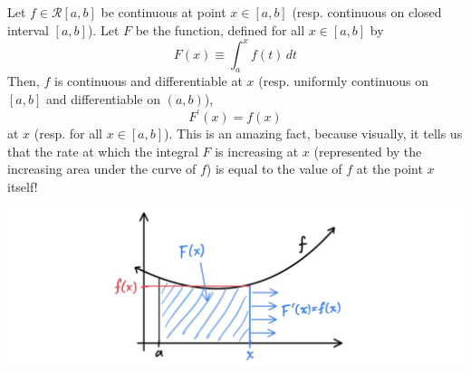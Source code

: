     \begin{theorem}
    Let $f \in \mathcal{R}[a, b]$ be continuous at point $x \in [a, b]$ (resp. continuous on closed interval $[a, b]$). Let $F$ be the function, defined for all $x \in [a, b]$ by 
    \[F(x) \equiv \int_a^x f(t)\,dt\]
    Then, $f$ is continuous and differentiable at $x$ (resp. uniformly continuous on $[a, b]$ and differentiable on $(a, b)$), 
    \[F^\prime (x) = f(x)\]
    at $x$ (resp. for all $x \in [a, b]$). This is an amazing fact, because visually, it tells us that the rate at which the integral $F$ is increasing at $x$ (represented by the increasing area under the curve of $f$) is equal to the value of $f$ at the point $x$ itself! 
    \begin{center}
        \includegraphics[scale=0.25]{img/First_Fundamental_Theorem_Analysis.jpg}
    \end{center}
    \end{theorem}
